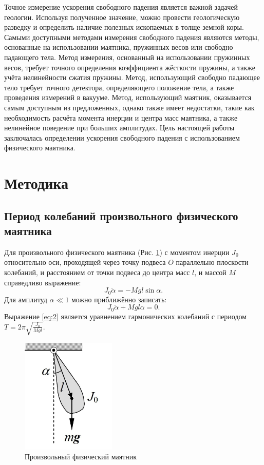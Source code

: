 \documentclass[12pt]{article}
\begin{document}
Точное измерение ускорения свободного падения является важной задачей геологии. Используя полученное значение, можно провести геологическую
разведку и определить наличие полезных ископаемых в толще земной коры. Самыми доступными методами измерения свободного падения являются методы,
основанные на использовании маятника, пружинных весов или свободно падающего тела. Метод измерения, основанный на использовании пружинных весов,
требует точного определения коэффициента жёсткости пружины, а также учёта нелинейности сжатия пружины. Метод, использующий свободно падающее
тело требует точного детектора, определяющего положение тела, а также проведения измерений в вакууме. Метод, использующий маятник, оказывается 
самым доступным из предложенных, однако также имеет недостатки, такие как необходимость расчёта момента инерции и центра масс маятника, а также нелинейное 
поведение при больших амплитудах. Цель настоящей работы заключалась определении ускорения свободного падения с использованием физического маятника.

\section{Методика}
\subsection{Период колебаний произвольного физического маятника}
Для произвольного физического маятника (Рис. \ref{fig:1}) с моментом инерции $J_0$ относительно оси, проходящей через точку подвеса $O$
параллельно плоскости колебаний, и расстоянием от точки подвеса до центра масс $l$, и массой $M$ справедливо выражение:
\begin{equation}\label{eq:1}
    J_0\ddot{\alpha} = -Mgl\sin{\alpha}.
\end{equation}
Для амплитуд $\alpha \ll 1$ можно приближённо записать:
\begin{equation}\label{eq:2}
    J_0\ddot{\alpha} + Mgl\alpha = 0.
\end{equation}
Выражение \ref{eq:2} является уравнением гармонических колебаний с периодом $T = 2\pi\sqrt{\frac{J_0}{Mgl}}$.

\begin{figure}
    \begin{center}
        \includegraphics[width=0.4\textwidth]{ph1}
    \end{center}
    \caption{Произвольный физический маятник}
    \label{fig:1}
\end{figure}
\end{document}
